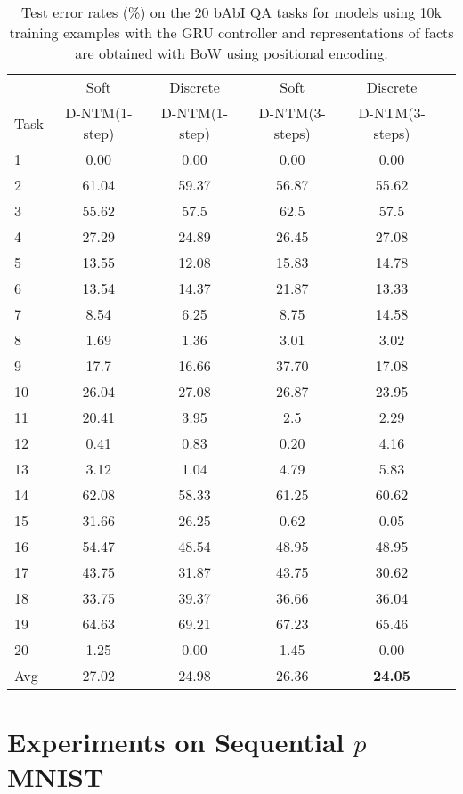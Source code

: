 \documentclass[12pt]{article}
\begin{document}
\begin{table*}[htbp]
\vspace{-2mm}
  \centering
  \footnotesize 
\begin{tabular}{ | l || c |c | c | c | c |}
\hline
&  Soft & Discrete & Soft & Discrete  \\
Task & D-NTM(1-step) & D-NTM(1-step)  & D-NTM(3-steps) & D-NTM(3-steps)\\ \hline

1 & 0.00 & 0.00 & 0.00 & 0.00\\
2 & 61.04 & 59.37 & 56.87 & 55.62 \\
3 & 55.62 & 57.5 & 62.5 & 57.5 \\
4 & 27.29 & 24.89 & 26.45 & 27.08 \\
5 & 13.55 & 12.08 & 15.83 & 14.78 \\
6 & 13.54 & 14.37 & 21.87 & 13.33 \\
7 & 8.54 & 6.25 & 8.75 & 14.58 \\
8 & 1.69 & 1.36 & 3.01 & 3.02 \\
9 & 17.7 & 16.66 & 37.70 & 17.08 \\
10 & 26.04 & 27.08 & 26.87 & 23.95 \\
11 & 20.41 & 3.95 & 2.5 & 2.29 \\
12 & 0.41 & 0.83 & 0.20 & 4.16 \\
13  & 3.12 & 1.04 & 4.79 & 5.83 \\
14 & 62.08 & 58.33 & 61.25 & 60.62 \\
15 & 31.66 & 26.25 & 0.62 & 0.05 \\
16 & 54.47 & 48.54 & 48.95 & 48.95 \\
17  & 43.75 & 31.87 & 43.75 & 30.62 \\
18 & 33.75 & 39.37 & 36.66 & 36.04\\
19 & 64.63 & 69.21 & 67.23 & 65.46\\
20 & 1.25 & 0.00 & 1.45 & 0.00 \\\hline
Avg & 27.02 & 24.98 & 26.36 & {\bf 24.05} \\\hline

\end{tabular}
\caption{Test error rates (\%) on the 20 bAbI QA tasks for models using 10k training examples with the GRU controller and representations of facts are obtained with BoW using positional encoding.}
\label{app:babi_10k_soft_bow}
\end{table*}

\section{Experiments on Sequential $p$MNIST}
\end{document}
